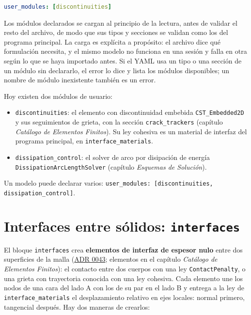 \documentclass[11pt,oneside]{report}
\begin{document}
\begin{lstlisting}[language=yaml]
user_modules: [discontinuities]

\end{lstlisting}

Los módulos declarados se cargan al principio de la lectura, antes de validar el resto del archivo, de modo que sus tipos y secciones se validan como los del programa principal. La carga es explícita a propósito: el archivo dice qué formulación necesita, y el mismo modelo no funciona en una sesión y falla en otra según lo que se haya importado antes. Si el YAML usa un tipo o una sección de un módulo sin declararlo, el error lo dice y lista los módulos disponibles; un nombre de módulo inexistente también es un error.

Hoy existen dos módulos de usuario:

\begin{itemize}
  \item \texttt{discontinuities}: el elemento con discontinuidad embebida \texttt{CST\_Embedded2D} y sus seguimientos de grieta, con la sección \texttt{crack\_trackers} (capítulo \textit{Catálogo de Elementos Finitos}). Su ley cohesiva es un material de interfaz del programa principal, en \texttt{interface\_\allowbreak{}materials}.
  \item \texttt{dissipation\_\allowbreak{}control}: el solver de arco por disipación de energía \texttt{DissipationArcLengthSolver} (capítulo \textit{Esquemas de Solución}).
\end{itemize}

Un modelo puede declarar varios: \texttt{user\_\allowbreak{}modules: [discontinuities, dissipation\_\allowbreak{}control]}.

\section{Interfaces entre sólidos: \texttt{interfaces}}

El bloque \texttt{interfaces} crea \textbf{elementos de interfaz de espesor nulo} entre dos superficies de la malla (\href{https://github.com/jretamav/solidum-fem/blob/main/docs/adr/0043-elementos-de-interfaz-de-espesor-nulo.md}{ADR 0043}; elementos en el capítulo \textit{Catálogo de Elementos Finitos}): el contacto entre dos cuerpos con una ley \texttt{ContactPenalty}, o una grieta con trayectoria conocida con una ley cohesiva. Cada elemento une los nodos de una cara del lado A con los de su par en el lado B y entrega a la ley de \texttt{interface\_\allowbreak{}materials} el desplazamiento relativo en ejes locales: normal primero, tangencial después. Hay dos maneras de crearlos:
\end{document}
